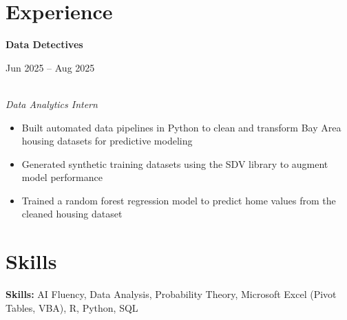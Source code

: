 \documentclass[11pt,letterpaper]{article}
\newcommand{\entry}[3]{%
  \noindent\begin{minipage}[t]{0.72\textwidth}\raggedright\textbf{#1}\end{minipage}%
  \hfill\begin{minipage}[t]{0.26\textwidth}\raggedleft\small\color{gray}#2\end{minipage}\\
  \textit{#3}\par\vspace{2pt}
}
\begin{document}


\vspace{6pt}



\section*{Experience}



\entry{Data Detectives}{Jun 2025 -- Aug 2025}{Data Analytics Intern}
\begin{itemize}
  \item Built automated data pipelines in Python to clean and transform Bay Area housing datasets for predictive modeling
  \item Generated synthetic training datasets using the SDV library to augment model performance
  \item Trained a random forest regression model to predict home values from the cleaned housing dataset
\end{itemize}





\section*{Skills}
\textbf{Skills:} AI Fluency, Data Analysis, Probability Theory, Microsoft Excel (Pivot Tables, VBA), R, Python, SQL
\end{document}
